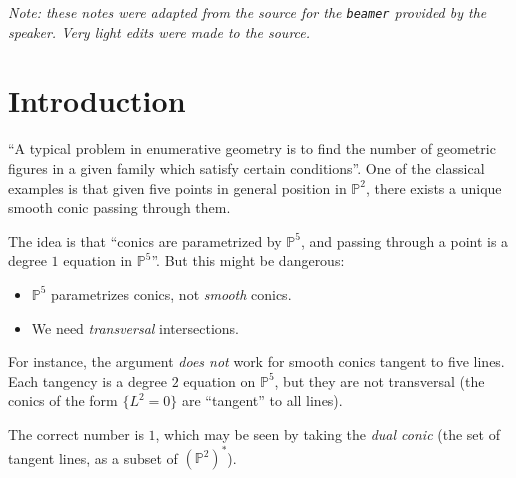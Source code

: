 \documentclass[leqno, openany]{memoir}
\theoremstyle{definition}
\theoremstyle{remark}
\theoremstyle{plain}
\theoremstyle{definition}
\theoremstyle{remark}
\renewcommand{\P}{\mathbb{P}}
\begin{document}
\textit{Note: these notes were adapted from the source for the \texttt{beamer}
provided by the speaker. Very light edits were made to the source.} 

\section{Introduction}

``A typical problem in enumerative geometry is to find the number of geometric
figures in a given family which satisfy certain conditions''.  One of the
classical examples is that given five points in general position in $\P^2$,
there exists a unique smooth conic passing through them.  \begin{figure}[H]
    \centering {}
                        \end{figure}

The idea is that ``conics are parametrized by $\P^5$, and passing through a
point is a degree $1$ equation in $\P^5$''.  But this might be dangerous:
\begin{itemize} \item $\P^5$ parametrizes conics, not \emph{smooth} conics.
    \item We need \emph{transversal} intersections.  \end{itemize}

For instance, the argument \emph{does not} work for  smooth conics tangent to
five lines. Each tangency is a degree $2$ equation on $\P^5$, but they are not
transversal (the conics of the form $\{L^2=0\}$ are ``tangent'' to all lines). 

The correct number is $1$, which may be seen by taking the \emph{dual conic}
(the set of tangent lines, as a subset of ${ (\P^2) }^\ast$).
\end{document}
